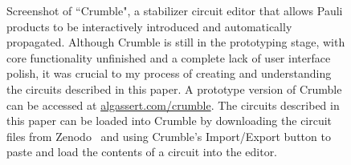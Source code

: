 \documentclass[onecolumn,unpublished,a4paper]{quantumarticle}
\theoremstyle{definition}
\theoremstyle{definition}
\theoremstyle{definition}
\begin{document}
\begin{figure}
    \centering
    \caption{
        Screenshot of ``Crumble", a stabilizer circuit editor that allows Pauli products to be interactively introduced and automatically propagated.
        Although Crumble is still in the prototyping stage, with core functionality unfinished and a complete lack of user interface polish, it was crucial to my process of creating and understanding the circuits described in this paper.
        A prototype version of Crumble can be accessed at \href{https://algassert.com/crumble}{algassert.com/crumble}.
        The circuits described in this paper can be loaded into Crumble by downloading the circuit files from Zenodo~\cite{gidneyybasisdata2022} and using Crumble's Import/Export button to paste and load the contents of a circuit into the editor.
    }
    \label{fig:crumble}
\end{figure}
\end{document}
